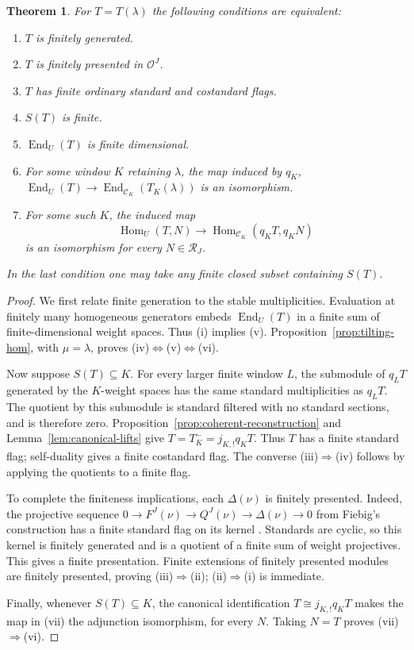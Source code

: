 \documentclass[11pt,reqno]{amsart}
\newcommand{\OO}{\mathcal O}\newcommand{\CC}{\mathscr C}\newcommand{\RR}{\mathcal R}\newcommand{\DD}{\mathcal D}
\newcommand{\Hom}{\operatorname{Hom}}\newcommand{\End}{\operatorname{End}}\newcommand{\Ext}{\operatorname{Ext}}
\newtheorem{theorem}{Theorem}[section]
\theoremstyle{definition}
\theoremstyle{remark}
\numberwithin{equation}{section}
\begin{document}
\begin{theorem}\label{thm:recovery}
For $T=T(\lambda)$ the following conditions are equivalent:
\begin{enumerate}
\item $T$ is finitely generated.
\item $T$ is finitely presented in $\OO^J$.
\item $T$ has finite ordinary standard and costandard flags.
\item $S(T)$ is finite.
\item $\End_U(T)$ is finite dimensional.
\item For some window $K$ retaining $\lambda$, the map induced by $q_K$,
      $\End_U(T)\to\End_{\CC_K}(T_K(\lambda))$ is an isomorphism.
\item For some such $K$, the induced map
\[
 \Hom_U(T,N)\longrightarrow\Hom_{\CC_K}(q_KT,q_KN)
\]
is an isomorphism for every $N\in\RR_J$.
\end{enumerate}
In the last condition one may take any finite closed subset containing
$S(T)$.
\end{theorem}
\begin{proof}
We first relate finite generation to the stable multiplicities.
Evaluation at finitely many homogeneous generators embeds $\End_U(T)$
in a finite sum of finite-dimensional weight spaces. Thus (i) implies
(v). Proposition~\ref{prop:tilting-hom}, with $\mu=\lambda$, proves
(iv)$\Leftrightarrow$(v)$\Leftrightarrow$(vi).

Now suppose $S(T)\subseteq K$. For every larger finite window $L$, the
submodule of $q_LT$ generated by the $K$-weight spaces has the same
standard multiplicities as $q_LT$. The quotient by this submodule
is standard filtered with no standard sections, and is therefore
zero. Proposition~\ref{prop:coherent-reconstruction} and
Lemma~\ref{lem:canonical-lifts} give
$T=T_K^-=j_{K,!}q_KT$. Thus $T$ has a finite standard flag; self-duality
gives a finite costandard flag. The converse (iii)$\Rightarrow$(iv)
follows by applying the quotients to a finite flag.

To complete the finiteness implications, each $\Delta(\nu)$ is
finitely presented. Indeed, the projective
sequence
$0\to F^J(\nu)\to Q^J(\nu)\to\Delta(\nu)\to0$
from Fiebig's construction has a finite standard flag on its kernel
\cite[proof of Theorem~17]{Fiebig}. Standards are cyclic, so this kernel is
finitely generated and is a quotient of a finite sum of weight
projectives. This gives a finite presentation. Finite extensions of
finitely presented modules are finitely presented, proving
(iii)$\Rightarrow$(ii); (ii)$\Rightarrow$(i) is immediate.

Finally, whenever $S(T)\subseteq K$, the canonical identification
$T\cong j_{K,!}q_KT$ makes the map in (vii) the adjunction
isomorphism, for every $N$. Taking $N=T$ proves
(vii)$\Rightarrow$(vi).
\end{proof}
\end{document}
